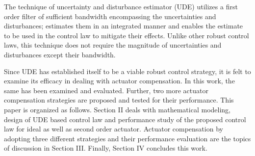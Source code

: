 \documentclass[conference]{IEEEtran}
\begin{document}
The technique of uncertainty and disturbance estimator (UDE) \cite{zhong2004} utilizes a first order filter of sufficient bandwidth encompassing the uncertainties and disturbances; estimates them in an integrated manner and enables the estimate to be used in the control law to mitigate their effects. Unlike other robust control laws, this technique does not require the magnitude of uncertainties and disturbances except their bandwidth. 


Since UDE has established itself to be a viable robust control strategy, it is felt to examine its efficacy in dealing with actuator compensation. In this work, the same has been examined and evaluated. Further, two more actuator compensation strategies are proposed and tested for their performance. This paper is organized as follows. Section II deals with mathematical modeling, design of UDE based control law and performance study of the proposed control law for ideal as well as second order actuator. Actuator compensation by adopting three different strategies and their performance evaluation are the topics of discussion in Section III. Finally, Section IV concludes this work.
\end{document}
